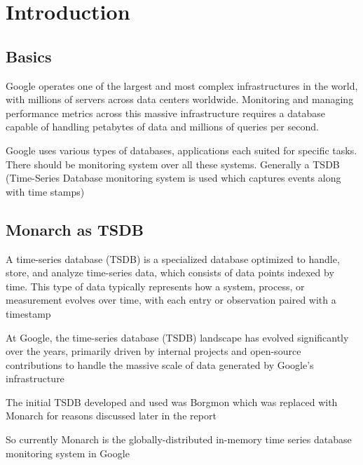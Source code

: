 \chapter{Introduction}

\label{Chapter1} %



\section{Basics}

Google operates one of the largest and most complex infrastructures in the world, with millions of servers across data centers worldwide. Monitoring and managing performance metrics across this massive infrastructure requires a database capable of handling petabytes of data and millions of queries per second.

Google uses various types of databases, applications each suited for specific tasks. There should be monitoring system over all these systems. Generally a TSDB (Time-Series Database monitoring system is used which captures events along with time stamps)


\section{Monarch as TSDB}

A time-series database (TSDB) is a specialized database optimized to handle, store, and analyze time-series data, which consists of data points indexed by time. This type of data typically represents how a system, process, or measurement evolves over time, with each entry or observation paired with a timestamp

At Google, the time-series database (TSDB) landscape has evolved significantly over the years, primarily driven by internal projects and open-source contributions to handle the massive scale of data generated by Google's infrastructure

The initial TSDB developed and used was Borgmon which was replaced with Monarch for reasons discussed later in the report

So currently Monarch is the globally-distributed in-memory time series database monitoring system in Google
